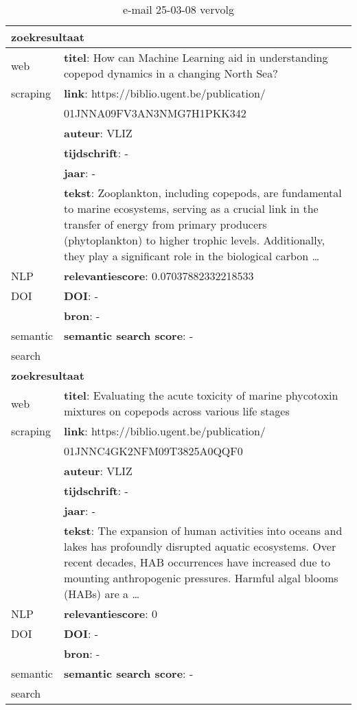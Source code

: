 \begin{table}[h!]
    \caption{e-mail 25-03-08 vervolg}
    \centering
    \begin{tabularx}{\textwidth}{|p{4cm}|X|} 
        \hline
        \multicolumn{2}{|X|}{\textbf{zoekresultaat}} \\
        \hline
        web &\textbf{titel}: How can Machine Learning aid in understanding copepod dynamics in a changing North Sea?\\
        scraping&\textbf{link}: https://biblio.ugent.be/publication/\\&01JNNA09FV3AN3NMG7H1PKK342\\
        &\textbf{auteur}: VLIZ\\
        &\textbf{tijdschrift}: -\\
        &\textbf{jaar}: -\\
        &\textbf{tekst}: Zooplankton, including copepods, are fundamental to marine ecosystems, serving as a crucial link in the transfer of energy from primary producers (phytoplankton) to higher trophic levels. Additionally, they play a significant role in the biological carbon …\\
        \hline
        NLP&\textbf{relevantiescore}: 0.07037882332218533\\
        \hline
        DOI&\textbf{DOI}: -\\
        &\textbf{bron}: -\\
        \hline
        semantic&\textbf{semantic search score}: -\\
        search&\\
        \hline
        \multicolumn{2}{|X|}{\textbf{zoekresultaat}} \\
        \hline
        web &\textbf{titel}: Evaluating the acute toxicity of marine phycotoxin mixtures on copepods across various life stages\\
        scraping&\textbf{link}: https://biblio.ugent.be/publication/\\&01JNNC4GK2NFM09T3825A0QQF0\\
        &\textbf{auteur}: VLIZ\\
        &\textbf{tijdschrift}: -\\
        &\textbf{jaar}: -\\
        &\textbf{tekst}: The expansion of human activities into oceans and lakes has profoundly disrupted aquatic ecosystems. Over recent decades, HAB occurrences have increased due to mounting anthropogenic pressures. Harmful algal blooms (HABs) are a …\\
        \hline
        NLP&\textbf{relevantiescore}: 0\\
        \hline
        DOI&\textbf{DOI}: -\\
        &\textbf{bron}: -\\
        \hline
        semantic&\textbf{semantic search score}: -\\
        search&\\
        \hline
    \end{tabularx}
    \label{table:email20250308vervolg}
\end{table}
